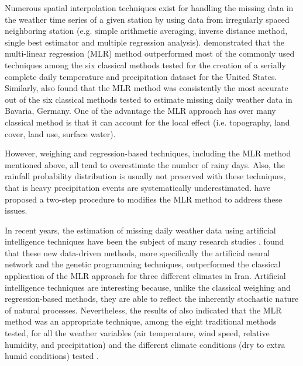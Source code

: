 \documentclass[WHATMANUAL.tex]{subfiles}
\begin{document}
Numerous spatial interpolation techniques exist for handling the missing data in the weather time series of a given station by using data from irregularly spaced neighboring station (e.g. simple arithmetic averaging, inverse distance method, single best estimator and multiple regression analysis). \cite{eischeid_creating_2000} demonstrated that the multi-linear regression (MLR) method \citep{degaetano_method_1995} outperformed most of the commonly used techniques among the six classical methods tested for the creation of a serially complete daily temperature and precipitation dataset for the United States. Similarly, \cite{xia_forest_1999} also found that the MLR method was consistently the most accurate out of the six classical methods tested to estimate missing daily weather data in Bavaria, Germany. One of the advantage the MLR approach has over many classical method is that it can account for the local effect (i.e. topography, land cover, land use, surface water).

However, weighing and regression-based techniques, including the MLR method mentioned above, all tend to overestimate the number of rainy days. Also, the rainfall probability distribution is usually not preserved with these techniques, that is heavy precipitation events are systematically underestimated. \cite{simolo_improving_2010} have proposed a two-step procedure to modifies the MLR method to address these issues.

In recent years, the estimation of missing daily weather data using artificial intelligence techniques have been the subject of many research studies \cite{kashani_evaluation_2011,kim_spatial_2008,srikanthan_comparison_2005,coulibaly_comparison_2007,abebe_application_2000,teegavarapu_improved_2005}. \cite{kashani_evaluation_2011} found that these new data-driven methods, more specifically the artificial neural network and the genetic programming techniques, outperformed the classical application of the MLR approach for three different climates in Iran. Artificial intelligence techniques are interesting because, unlike the classical weighing and regression-based methods, they are able to reflect the inherently stochastic nature of natural processes. Nevertheless, the results of \cite{kashani_evaluation_2011} also indicated that the MLR method was an appropriate technique, among the eight traditional methods tested, for all the weather variables (air temperature, wind speed, relative humidity, and precipitation) and the different climate conditions (dry to extra humid conditions) tested \citep{kashani_evaluation_2011}.
\end{document}
